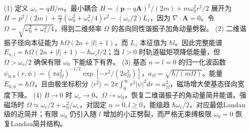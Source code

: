 (1) 定义 \(\omega_c=qB/m\)。最小耦合 \(H=(\mathbf p-q\mathbf A)^2/(2m)+m\omega_0^2r^2/2\) 展开为 \(H=p^2/(2m)+\frac m2(\omega_0^2+\omega_c^2/4)r^2-(\omega_c/2)L_z\)，因为 \(\nabla\cdot\mathbf A=0\)。令 \(\Omega=\sqrt{\omega_0^2+\omega_c^2/4}\)，得到二维频率 \(\Omega\) 的各向同性谐振子加角动量劈裂。
(2) 二维谐振子径向本征能为 \(\hbar\Omega(2n+|l|+1)\)，而 \(L_z\) 本征值为 \(\hbar l\)。因此完整能谱 \(E_{n,l}=\hbar\Omega(2n+|l|+1)-\hbar\omega_c l/2\)；当 \(l>0\) 时轨道磁矩项降低能量，但 \(\Omega>\omega_c/2\) 确保有限 \(\omega_0\) 下能级下有界。
(3) 基态 \(n=l=0\) 的归一化波函数 \(\psi_{0,0}(r,\phi)=(\pi a_\Omega^2)^{-1/2}\exp[-r^2/(2a_\Omega^2)]\)，\(a_\Omega=\sqrt{\hbar/(m\Omega)}\)。能量 \(E_{0,0}=\hbar\Omega\)，且由极坐标积分 \(\langle r^2\rangle=2\pi\int_0^\infty r^3|\psi|^2dr=a_\Omega^2\)，磁场增大使基态径向宽度下降。
(4) \(B\to0\) 时 \(\omega_c\to0\)、\(\Omega\to\omega_0\)，恢复二维谐振子的角动量简并能谱。强磁场时 \(\Omega\simeq\omega_c/2+\omega_0^2/\omega_c\)，对固定 \(n=0,l\ge0\)，能级趋 \(\hbar\omega_c/2\)，对应最低Landau级的近简并；有限 \(\omega_0\) 仍引入随 \(l\) 增加的小正劈裂，而严格无束缚极限 \(\omega_0=0\) 恢复Landau简并结构。
